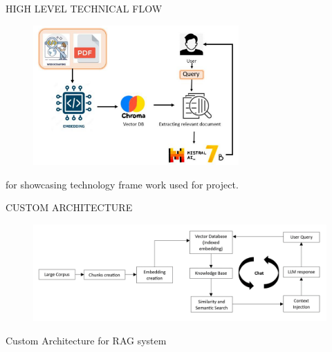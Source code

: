 \documentclass{beamer}
\begin{document}
\begin{frame}{HIGH LEVEL TECHNICAL FLOW}
    \begin{figure}
    \includegraphics[width=0.7\textwidth]{F3.png}
        
    \end{figure}
\begin{center}
    for showcasing technology frame work used for project.
\end{center}
     

\end{frame}




\begin{frame}{CUSTOM ARCHITECTURE}
\begin{center}
        \begin{figure}
    \includegraphics[width=1\textwidth]{F4.png}
        
    \end{figure}
\end{center}

    \begin{center}
        Custom Architecture for RAG system

    \end{center} 

\end{frame}
\end{document}
